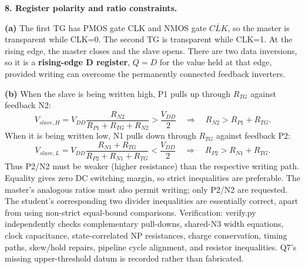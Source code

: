 \documentclass[10pt]{article}
\begin{document}
\newpage\textbf{8. Register polarity and ratio constraints.}
\begin{center}\end{center}
\textbf{(a)} The first TG has PMOS gate CLK and NMOS gate $\overline{CLK}$, so the master is transparent while CLK=0. The second TG is transparent while CLK=1. At the rising edge, the master closes and the slave opens. There are two data inversions, so it is a \textbf{rising-edge D register}, $Q=D$ for the value held at that edge, provided writing can overcome the permanently connected feedback inverters.

\textbf{(b)} When the slave is being written high, P1 pulls up through $R_{TG}$ against feedback N2:
\[V_{slave,H}=V_{DD}\frac{R_{N2}}{R_{P1}+R_{TG}+R_{N2}}>\frac{V_{DD}}2
\quad\Longrightarrow\quad\boxed{R_{N2}>R_{P1}+R_{TG}}.\]
When it is being written low, N1 pulls down through $R_{TG}$ against feedback P2:
\[V_{slave,L}=V_{DD}\frac{R_{N1}+R_{TG}}{R_{P2}+R_{N1}+R_{TG}}<\frac{V_{DD}}2
\quad\Longrightarrow\quad\boxed{R_{P2}>R_{N1}+R_{TG}}.\]
Thus P2/N2 must be weaker (higher resistance) than the respective writing path. Equality gives zero DC switching margin, so strict inequalities are preferable. The master's analogous ratios must also permit writing; only P2/N2 are requested. The student's corresponding two divider inequalities are essentially correct, apart from using non-strict equal-bound comparisons.
\small Verification: verify.py independently checks complementary pull-downs, shared-N3 width equations, clock capacitance, state-correlated NP resistances, charge conservation, timing paths, skew/hold repairs, pipeline cycle alignment, and resistor inequalities. Q7's missing upper-threshold datum is recorded rather than fabricated.
\end{document}
